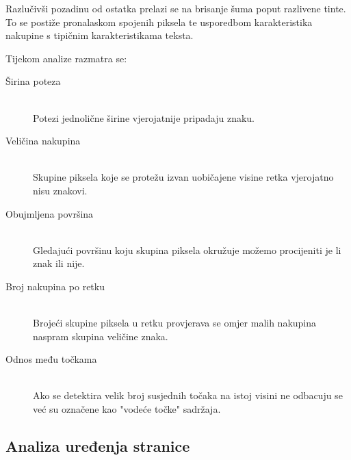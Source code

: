 \documentclass[zavrsnirad]{fer}
\begin{document}
Razlučivši pozadinu od ostatka prelazi se na brisanje šuma poput razlivene tinte. To se postiže pronalaskom spojenih piksela te usporedbom karakteristika nakupine s tipičnim karakteristikama teksta.

Tijekom analize razmatra se: \cite{Tesseract}

\begin{description}
	\item[Širina poteza] \hfill \\ Potezi jednolične širine vjerojatnije pripadaju znaku.
	\item[Veličina nakupina] \hfill \\ Skupine piksela koje se protežu izvan uobičajene visine retka vjerojatno nisu znakovi.
	\item[Obujmljena površina] \hfill \\ Gledajući površinu koju skupina piksela okružuje možemo procijeniti je li znak ili nije.
	\item[Broj nakupina po retku] \hfill \\ Brojeći skupine piksela u retku provjerava se omjer malih nakupina naspram skupina veličine znaka.
 	\item[Odnos među točkama] \hfill \\ Ako se detektira velik broj susjednih točaka na istoj visini ne odbacuju se već su označene kao "vodeće točke" sadržaja.
\end{description}

\subsection{Analiza uređenja stranice}
\end{document}
